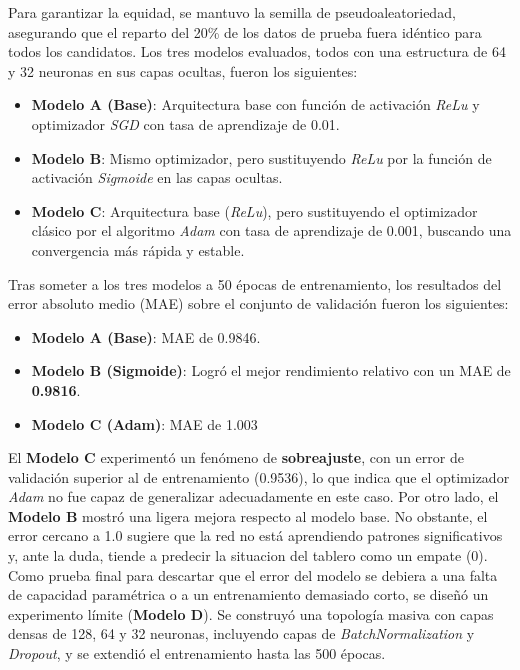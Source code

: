 \documentclass[conference]{IEEEtran}
\begin{document}
Para garantizar la equidad, se mantuvo la semilla de pseudoaleatoriedad, asegurando que el reparto del 20\% de los datos de prueba fuera idéntico para todos los candidatos. 
Los tres modelos evaluados, todos con una estructura de 64 y 32 neuronas    en sus capas ocultas, fueron los siguientes:\\
\begin{itemize}
    \item \textbf{Modelo A (Base)}: Arquitectura base con función de activación \textit{ReLu} y optimizador \textit{SGD} con tasa de aprendizaje de 0.01.
    \item \textbf{Modelo B}: Mismo optimizador, pero sustituyendo \textit{ReLu} por la función de activación \textit{Sigmoide} en las capas ocultas.
    \item \textbf{Modelo C}: Arquitectura base (\textit{ReLu}), pero sustituyendo el optimizador clásico por el algoritmo \textit{Adam} con tasa de aprendizaje de 0.001, buscando
    una convergencia más rápida y estable.\\
\end{itemize}

Tras someter a los tres modelos a 50 épocas de entrenamiento, los resultados del error absoluto medio (MAE) sobre el conjunto de validación fueron los siguientes:
\begin{itemize}
    \item \textbf{Modelo A (Base)}: MAE de 0.9846.
    \item \textbf{Modelo B (Sigmoide)}: Logró el mejor rendimiento relativo con un MAE de \textbf{0.9816}.
    \item \textbf{Modelo C (Adam)}: MAE de 1.003\\
\end{itemize}

El \textbf{Modelo C} experimentó un fenómeno de \textbf{sobreajuste}, con un error de validación superior al de entrenamiento (0.9536), lo que indica que el optimizador \textit{Adam} no fue capaz 
de generalizar adecuadamente en este caso. Por otro lado, el \textbf{Modelo B} mostró una ligera mejora respecto al modelo base. No obstante, el error cercano a 1.0 sugiere que
la red no está aprendiendo patrones significativos y, ante la duda, tiende a predecir la situacion del tablero como un empate (0).\\

Como prueba final para descartar que el error del modelo se debiera a una falta de capacidad paramétrica o a un entrenamiento demasiado corto, se diseñó un experimento 
límite (\textbf{Modelo D}). Se construyó una topología masiva con capas densas de 128, 64 y 32 neuronas, incluyendo capas de \textit{BatchNormalization} y \textit{Dropout}, y se extendió el entrenamiento hasta las 500 épocas. \\
\end{document}

